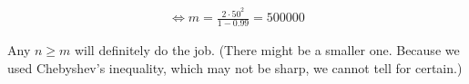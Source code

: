 \begin{solution}
\begin{align*}
    \iff
    m = \frac{2 \cdot 50^2}{1 - 0.99} = 500 000
\end{align*}

Any $n \geq m$ will definitely do the job.
(There might be a smaller one. Because we used Chebyshev's inequality, which may not be sharp, we cannot tell for certain.)

\begin{comment}

    Furthermore, let

    \begin{align*}
        X_i := X_{i, 1} - X_{i, 2},
        \quad
        i = 1, \dots, n,
    \end{align*}

    and

    \begin{align*}
        \bar X_n
        & :=
        \bar X_{n, 1} - \bar X_{n, 2} \\
        & =
        \frac{1}{n} \sum_{i=1}^n X_{i, 1}
        -
        \frac{1}{n} \sum_{i=1}^n X_{i, 2} \\
        & =
        \frac{1}{n} \sum_{i=1}^n X_{i, 1} - X_{i, 2} \\
        & =
        \frac{1}{n} \sum_{i=1}^n X_i.
    \end{align*}

    For $i = 1, \dots, n$ we calculate the first and second moments.

    \begin{align*}
        E(X_i) & = E(X_{i, 1} - X_{i, 2}) = E(X_{i, 1}) - E(X_{i, 2}) = \mu - \mu = 0 \\
        V(X_i) & = V(X_{i, 1} + (-X_{i, 2})) = V(X_{i, 1}) + V(-X_{i, 2}) + 2 \operatorname{Cov}(X_{i, 1}), -X_{i, 2}) = 2 \sigma^2 - 2 \operatorname{Cov}(X_{i, 1}, X_{i, 2})
    \end{align*}

    However, in order to apply the Central Limit Theorem, we should have

    \begin{align*}
        V(X_i) = \sigma^2 > 0
        \quad
        \text{i.e.}
        \quad
        \operatorname{Cov}(X_{i, 1}, X_{i, 2}) = \frac{\sigma^2}{2}.
    \end{align*}

    Let us assume the former.
    Due to the Central Limit Theorem \cite[Lecture 4, Slide 61]{EStat}, there exists a $Z \sim \mathcal N(0, 1)$ such that


\end{comment}
\end{solution}

